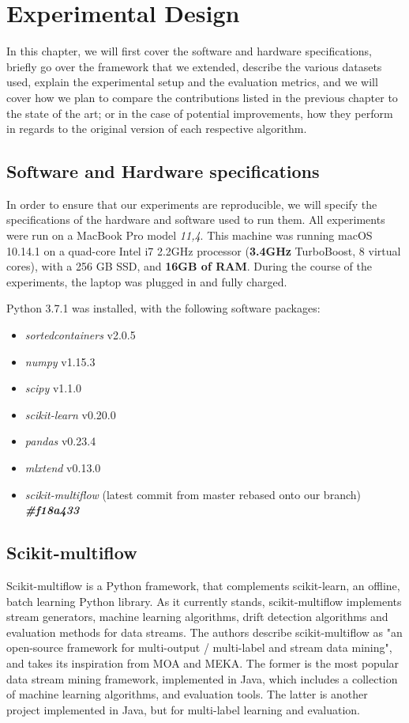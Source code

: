 

\chapter{Experimental Design\label{chapter:experimental_design}} %
In this chapter, we will first cover the software and hardware specifications, briefly go over the framework that we extended, describe the various datasets used, explain the experimental setup and the evaluation metrics, and we will cover how we plan to compare the contributions listed in the previous chapter to the state of the art; or in the case of potential improvements, how they perform in regards to the original version of each respective algorithm.


\section{Software and Hardware specifications}
In order to ensure that our experiments are reproducible, we will specify the specifications of the hardware and software used to run them. All experiments were run on a MacBook Pro model \textit{11,4}. This machine was running macOS 10.14.1 on a quad-core Intel i7 2.2GHz processor (\textbf{3.4GHz} TurboBoost, 8 virtual cores), with a 256 GB SSD, and \textbf{16GB of RAM}. During the course of the experiments, the laptop was plugged in and fully charged.

Python 3.7.1 was installed, with the following software packages:
\begin{itemize}
\item \textit{sortedcontainers} v2.0.5
\item \textit{numpy} v1.15.3
\item \textit{scipy} v1.1.0
\item \textit{scikit-learn} v0.20.0
\item \textit{pandas} v0.23.4
\item \textit{mlxtend} v0.13.0
\item \textit{scikit-multiflow} (latest commit from master rebased onto our branch) \textit{\textbf{\#f18a433}}
\end{itemize}

\section{Scikit-multiflow}
Scikit-multiflow \cite{skmultiflow} is a Python framework, that complements scikit-learn, an offline, batch learning Python library. As it currently stands, scikit-multiflow implements stream generators, machine learning algorithms, drift detection algorithms and evaluation methods for data streams. The authors describe scikit-multiflow as "an open-source framework for multi-output / multi-label and stream data mining", and takes its inspiration from MOA and MEKA. The former is the most popular data stream mining framework, implemented in Java, which includes a collection of machine learning algorithms, and evaluation tools. The latter is another project implemented in Java, but for multi-label learning and evaluation.

